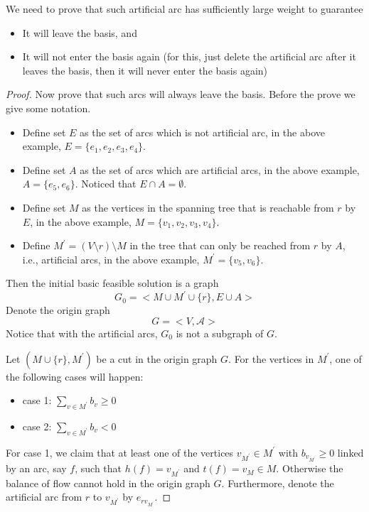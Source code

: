				We need to prove that such artificial arc has sufficiently large weight to guarantee
				\begin{itemize}
					\item It will leave the basis, and
					\item It will not enter the basis again (for this, just delete the artificial arc after it leaves the basis, then it will never enter the basis again)
				\end{itemize}
				\begin{proof}
					Now prove that such arcs will always leave the basis. Before the prove we give some notation. 
					\begin{itemize}
						\item Define set $E$ as the set of arcs which is not artificial arc, in the above example, $E = \{e_1, e_2, e_3, e_4\}$. 
						\item Define set $A$ as the set of arcs which are artificial arcs, in the above example, $A = \{e_5, e_6\}$. Noticed that $E \cap A = \emptyset$.
						\item Define set $M$ as the vertices in the spanning tree that is reachable from $r$ by $E$, in the above example, $M = \{v_1, v_2, v_3, v_4\}$.
						\item Define $M^\prime = (V\setminus r) \setminus M$ in the tree that can only be reached from $r$ by $A$, i.e., artificial arcs, in the above example, $M^\prime = \{v_5, v_6\}$. 
					\end{itemize}

					Then the initial basic feasible solution is a graph 
					\begin{equation}
						G_0 = <M\cup M^\prime \cup \{r\}, E\cup A>
					\end{equation}
					Denote the origin graph 
					\begin{equation}
						G = <V, \mathcal{A}>
					\end{equation}
					Notice that with the artificial arcs, $G_0$ is not a subgraph of $G$.
			
					Let $(M\cup\{r\}, M^\prime)$ be a cut in the origin graph $G$. For the vertices in $M^\prime$, one of the following cases will happen:
					\begin{itemize}
						\item case 1: $\sum_{v \in M^\prime} b_v \ge 0$
						\item case 2: $\sum_{v \in M^\prime} b_v < 0$
					\end{itemize}

					For case 1, we claim that at least one of the vertices $v_{M^\prime} \in M^\prime$ with $b_{v_{M^\prime}} \ge 0$ linked by an arc, say $f$, such that $h(f) = v_{M^\prime}$ and $t(f) = v_M \in M$. Otherwise the balance of flow cannot hold in the origin graph $G$. Furthermore, denote the artificial arc from $r$ to $v_{M^\prime}$ by $e_{rv_{M^\prime}}$.


\end{proof}
